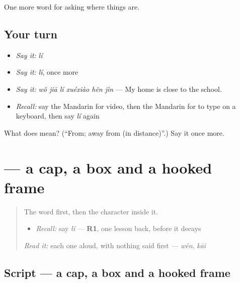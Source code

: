 \begin{grammarlens}[title={What you've built}]
One more word for asking where things are.
\end{grammarlens}

\subsection*{Your turn}
\begin{itemize}
\raggedright
  \item \emph{Say it:} \emph{lí}
  \item \emph{Say it:} \emph{lí}, once more
  \item \emph{Say it:} \emph{wǒ jiā lí xuéxiào hěn jìn} — My home is close to the school.
  \item \emph{Recall:} say the Mandarin for video, then the Mandarin for to type on a keyboard, then say \emph{lí} again
\end{itemize}

\begin{tcolorbox}[breakable,colback=teal!4,colframe=teal!35!black,title={Before you move on}]
What does  mean? (\textquotedblleft{}From; away from (in distance)\textquotedblright{}.) Say it once more.
\end{tcolorbox}
\section[\texorpdfstring{\zh{离} (lí)}{离 (lí)}]{ — a cap, a box and a hooked frame}

\label{lesson:ZH-W205-li-apart}



\begin{quote}
The word first, then the character inside it.

\begin{itemize}
\raggedright
  \item \emph{Recall:} say \emph{lí} — \textbf{R1}, one lesson back, before it decays
\end{itemize}

\begin{quote}
 
\end{quote}

\emph{Read it:} each one aloud, with nothing said first — \emph{wén}, \emph{kāi}
\end{quote}

\subsection*{Script — a cap, a box and a hooked frame}

